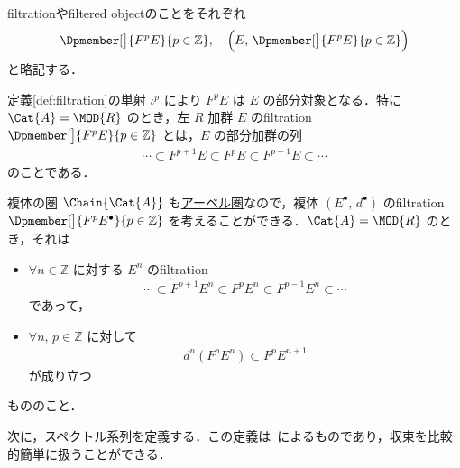 \documentclass[algtopo_main]{subfiles}
\begin{document}
\begin{marker}
    filtrationやfiltered objectのことをそれぞれ
    \begin{align}
        \Dpmember[\big]{F^pE}{p \in \mathbb{Z}},\quad \Bigl( E,\, \Dpmember[\big]{F^pE}{p \in \mathbb{Z}} \Bigr) 
    \end{align}
    と略記する．
\end{marker}

定義\ref{def:filtration}の単射 $\iota^p$ により $F^pE$ は $E$ の\hyperref[def:sub]{部分対象}となる．特に
$\Cat{A} = \MOD{R}$ のとき，左 $R$ 加群 $E$ のfiltration $\Dpmember[\big]{F^pE}{p \in \mathbb{Z}}$ とは，$E$ の部分加群の列
\begin{align}
    \cdots \subset F^{p+1}E \subset F^p E \subset F^{p-1} E \subset \cdots
\end{align}
のことである．

複体の圏 $\Chain{\Cat{A}}$ も\hyperref[def:Abel]{アーベル圏}なので，複体 $(E^\bullet,\, d^\bullet)$ のfiltration$\Dpmember[\big]{F^pE^\bullet}{p \in \mathbb{Z}}$ を考えることができる．$\Cat{A} = \MOD{R}$ のとき，それは
\begin{itemize}
    \item $\forall n \in \mathbb{Z}$ に対する $E^n$ のfiltration
    \begin{align}
        \cdots \subset F^{p+1}E^n \subset F^p E^n \subset F^{p-1} E^n \subset \cdots
    \end{align}
    であって，
    \item $\forall n,\, p \in \mathbb{Z}$ に対して
    \begin{align}
        d^n (F^p E^n) \subset F^p E^{n+1}
    \end{align}
    が成り立つ
\end{itemize}
もののこと．

次に，スペクトル系列を定義する．この定義は~\cite[定義3.49]{Shiho}によるものであり，収束を比較的簡単に扱うことができる．
\end{document}
